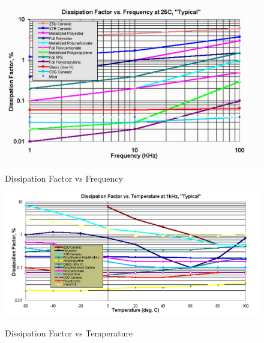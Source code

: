 \begin{figure}
    \includegraphics[keepaspectratio=true,scale=0.25]{../figures/df_vs_freq.png}
    \centering
    \cite{capSite_df_vs_freq}
    \caption{Dissipation Factor vs Frequency}
    \label{df_vs_freq}
\end{figure}

\begin{figure}
    \includegraphics[keepaspectratio=true,scale=0.2]{../figures/df_vs_temp.png}
    \centering
    \cite{capSite_df_vs_temp}
    \caption{Dissipation Factor vs Temperature}
    \label{df_vs_temp}
\end{figure}



